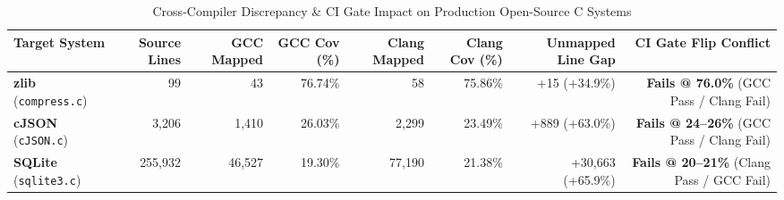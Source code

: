 \begin{table}[t]
\centering
\caption{Cross-Compiler Discrepancy & CI Gate Impact on Production Open-Source C Systems}
\label{tab:realworld_systems}
\begin{tabular}{lrrrrrrr}
\toprule
\textbf{Target System} & \textbf{Source Lines} & \textbf{GCC Mapped} & \textbf{GCC Cov (\%)} & \textbf{Clang Mapped} & \textbf{Clang Cov (\%)} & \textbf{Unmapped Line Gap} & \textbf{CI Gate Flip Conflict} \\
\midrule
\textbf{zlib} (\texttt{compress.c})      & 99      & 43     & 76.74\% & 58     & 75.86\% & +15 (+34.9\%)    & \textbf{Fails @ 76.0\%} (GCC Pass / Clang Fail) \\
\textbf{cJSON} (\texttt{cJSON.c})        & 3,206   & 1,410  & 26.03\% & 2,299  & 23.49\% & +889 (+63.0\%)   & \textbf{Fails @ 24--26\%} (GCC Pass / Clang Fail) \\
\textbf{SQLite} (\texttt{sqlite3.c})    & 255,932 & 46,527 & 19.30\% & 77,190 & 21.38\% & +30,663 (+65.9\%) & \textbf{Fails @ 20--21\%} (Clang Pass / GCC Fail) \\
\bottomrule
\end{tabular}
\end{table}
